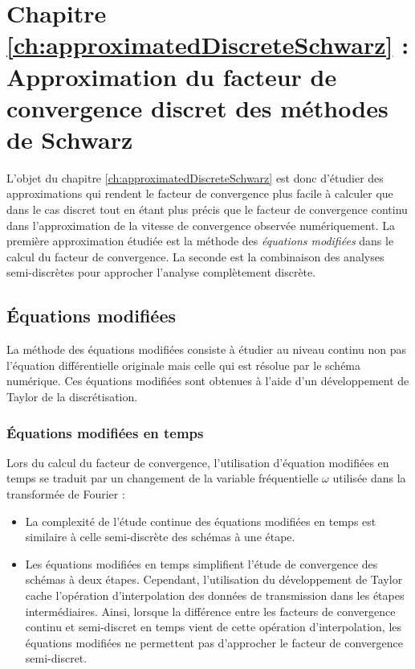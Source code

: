 \section*{Chapitre \ref{ch:approximatedDiscreteSchwarz} : Approximation du facteur de convergence discret des méthodes de Schwarz}
 L'objet du chapitre \ref{ch:approximatedDiscreteSchwarz} est donc d'étudier des approximations
qui rendent le facteur de convergence plus facile à calculer
que dans le cas discret tout en étant plus précis que le facteur
de convergence continu dans l'approximation de la vitesse
de convergence observée numériquement.
La première approximation étudiée est la méthode des
\textit{équations modifiées} dans le calcul du facteur de convergence.
La seconde est la combinaison des analyses semi-discrètes
pour approcher l'analyse complètement discrète.
\subsection*{Équations modifiées}
La méthode des équations modifiées consiste à étudier au niveau
continu non pas l'équation différentielle originale mais celle
qui est résolue par le schéma numérique.
Ces équations modifiées sont obtenues à l'aide d'un développement
de Taylor de la discrétisation.
\subsubsection*{Équations modifiées en temps}
Lors du calcul du facteur de convergence, l'utilisation d'équation
modifiées en temps se traduit par un changement de la variable
fréquentielle $\omega$ utilisée dans la transformée de Fourier :
\begin{itemize}
	\item
La complexité de l'étude continue des équations modifiées en temps
est similaire à celle semi-discrète des schémas à une étape.
	\item
Les équations modifiées en temps simplifient l'étude de convergence
des schémas à deux étapes. Cependant, l'utilisation du développement
de Taylor cache l'opération d'interpolation des données de
transmission dans les étapes intermédiaires. Ainsi, lorsque la
différence entre les facteurs de convergence continu
et semi-discret en temps vient de cette opération d'interpolation,
les équations modifiées ne permettent pas d'approcher le facteur
de convergence semi-discret.
\end{itemize}
